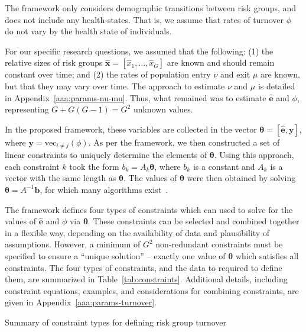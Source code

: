 The framework only considers demographic transitions between risk groups, and does not
include any health-states. That is, we assume that rates of turnover $\phi$
do not vary by the health state of individuals. 		%
\par
For our specific research questions,			%
we assumed that the following: (1) the relative sizes of risk groups		%
$\bm{\hat{x}} = [\hat{x}_1, \dots, \hat{x}_G]$
are known and should remain constant over time; and (2) 
the rates of population entry $\nu$ and exit $\mu$
are known, but that they may vary over time.
The approach to estimate $\nu$ and $\mu$ is detailed in Appendix~\ref{aaa:params-nu-mu}.
Thus, what remained was to estimate $\bm{\hat{e}}$ and $\phi$,
representing $G + G(G-1) = G^2$ unknown values.

In the proposed framework,
these variables are collected in the vector
$\bm{\theta} = \left[\bm{\hat{e}}, \bm{y}\right]$,
where $\bm{y} = \mathrm{vec}_{i \ne j}(\phi)$.
As per the framework, we then constructed a set of linear constraints
to uniquely determine the elements of $\bm{\theta}$.
Using this approach, each constraint $k$ took the form
$b_k = A_k \bm{\theta}$,
where $b_k$ is a constant and $A_k$ is a vector with the same length as $\bm{\theta}$.
The values of $\bm{\theta}$ were then obtained by solving
$\bm{\theta} = A^{-1}\bm{b}$,
for which many algorithms exist~\citep{LAPACK}.
\par
The framework defines four types of constraints which can used to
solve for the values of $\bm{\hat{e}}$ and $\phi$ via $\bm{\theta}$.
These constraints can be selected and combined together in a flexible way,
depending on the availability of data and plausibility of assumptions.
However, a minimum of $G^2$ non-redundant constraints must be specified
to ensure a ``unique solution''
-- exactly one value of $\bm{\theta}$ which satisfies all constraints.
The four types of constraints, and the data to required to define them,
are summarized in Table~\ref{tab:constraints}.
Additional details, including
constraint equations, examples, and considerations for combining constraints,
are given in Appendix~\ref{aaa:params-turnover}.%
\begin{table}
  \centering
  \caption{Summary of constraint types for defining risk group turnover}
  \label{tab:constraints}
  
\end{table}
